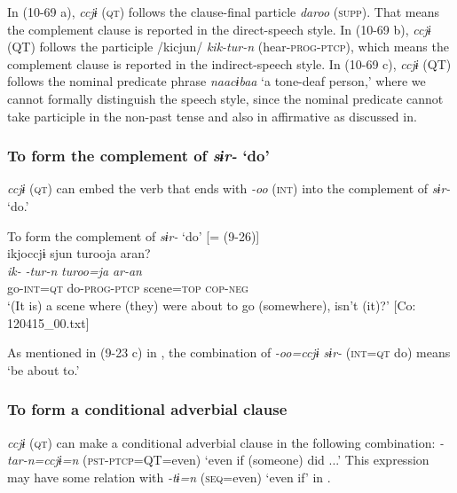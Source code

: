 In (10-69 a), \textit{ccjɨ} (\textsc{qt}) follows the clause-final particle \textit{daroo} (\textsc{supp}). That means the complement clause is reported in the direct-speech style. In (10-69 b), \textit{ccjɨ} (QT) follows the participle /kicjun/ \textit{kik-tur-n} (hear-\textsc{prog}-\textsc{ptcp}), which means the complement clause is reported in the indirect-speech style. In (10-69 c), \textit{ccjɨ} (QT) follows the nominal predicate phrase \textit{naacɨbaa} ‘a tone-deaf person,’ where we cannot formally distinguish the speech style, since the nominal predicate cannot take participle in the non-past tense and also in affirmative as discussed in.

\subsubsection{To form the complement of \textit{sɨr-} ‘do’}\label{sec:10.4.1.3}

\textit{ccjɨ} (\textsc{qt}) can embed the verb that ends with \textit{{}-oo} (\textsc{int}) into the complement of \textit{sɨr-} ‘do.’

\ea\label{ex:10.70}   To form the complement of \textit{sɨr-} ‘do’ [= (9-26)]\\
      \glll    ikjoccjɨ  sjun  turooja  aran?\\
    \textit{ik-}  \textit{-tur-n}  \textit{turoo=ja}  \textit{ar-an}\\
    go-\textsc{int}=\textsc{qt}  do-\textsc{prog}-\textsc{ptcp}  scene=\textsc{top}  \textsc{cop}-\textsc{neg}\\
\glt     ‘(It is) a scene where (they) were about to go (somewhere), isn’t (it)?’  [Co: 120415\_00.txt]
\z

As mentioned in (9-23 c) in , the combination of \textit{{}-oo=ccjɨ sɨr-} (\textsc{int}=\textsc{qt} do) means ‘be about to.’

\subsubsection{To form a conditional adverbial clause}\label{sec:10.4.1.4}

\textit{ccjɨ} (\textsc{qt}) can make a conditional adverbial clause in the following combination: \textit{{}-tar-n=ccjɨ=n} (\textsc{pst}-\textsc{ptcp}=QT=even) ‘even if (someone) did ...’ This expression may have some relation with \textit{{}-tɨ=n} (\textsc{seq}=even) ‘even if’ in .


